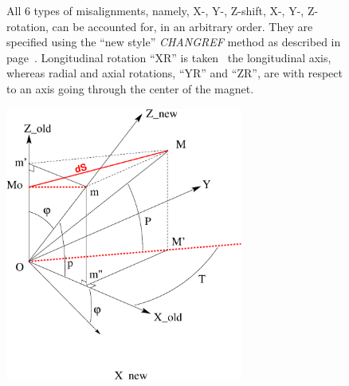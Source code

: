 \begin{figure}[h]

\noindent All 6 types of misalignments, namely, X-, Y-, Z-shift, X-, Y-, Z-rotation, can be accounted for, in an arbitrary order. 
They are specified using the ``new style'' \textsl{CHANGREF} method as described in page~\pageref{CHANGREFNew}. 
Longitudinal rotation ``XR'' is taken \wrt\ the longitudinal axis, whereas radial and axial rotations, ``YR'' and ``ZR'', 
 are  with respect to an axis going through the center of the magnet. 

%
%

\vspace{5ex}

\begin{center}
\includegraphics[height=9cm]{FigPitch.eps}
%


\end{center}
\end{figure}
